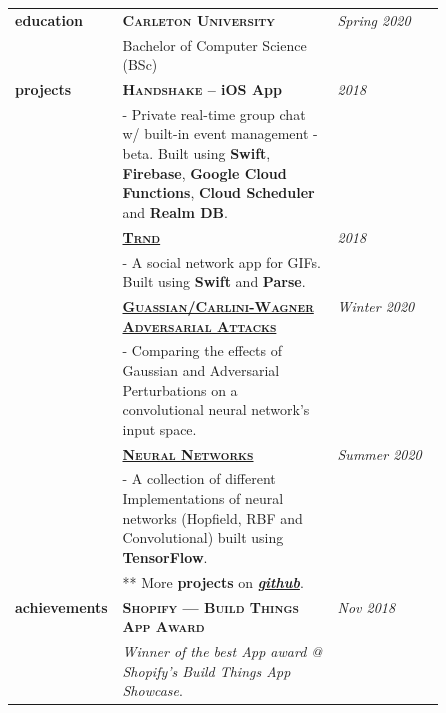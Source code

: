 \documentclass{article}
\begin{document}
\begin{longtable}{@{}>{\raggedleft}p{0.25\linewidth}
                          p{}>{}p{0.25\linewidth}@{}}
        \textbf{education}
            & \textbf{\textsc{Carleton University}} & \textit{Spring 2020} \\
            & Bachelor of Computer Science (BSc) \\ [1em]

        \textbf{projects}
            & \textbf{\textsc{Handshake} -- iOS App } & \textit{2018} \\
            & - Private real-time group chat w/ built-in event management - beta. Built using \textbf{Swift}, \textbf{Firebase}, \textbf{Google Cloud Functions}, \textbf{Cloud Scheduler}  and \textbf{Realm DB}.\\ [2em]

            & \textbf{\textsc{\href{https://github.com/kareemarab/trnd}{\textbf{Trnd}}}} & \textit{2018} \\
            & - A social network app for GIFs. Built using \textbf{Swift} and \textbf{Parse}. \\ [1em]

            & \textbf{\textsc{\href{https://github.com/kareemarab/advatck}{\textbf{Guassian/Carlini-Wagner Adversarial Attacks}}}}\ & \textit{Winter 2020} \\
            & - Comparing the effects of Gaussian and Adversarial Perturbations on a convolutional neural network's input space. \\ [2em]

            & \textbf{\textsc{\href{https://github.com/kareemarab/neuralnets}{\textbf{Neural Networks}}}} & \textit{Summer 2020} \\
            & - A collection of different Implementations of neural networks (Hopfield, RBF and Convolutional) built using \textbf{TensorFlow}. \\ [2em]


            & ** More \textbf{projects} on \textit{\href{https://github.com/kareemarab}{\textbf{github}}}.\\ [1em]

        \textbf{achievements}
            & \textbf{\textsc{Shopify --- Build Things App Award}} & \textit{Nov 2018} \\
            & \textit{Winner of the best App award @ Shopify's Build Things App Showcase}. \\ [1em]


\end{longtable}
\end{document}
